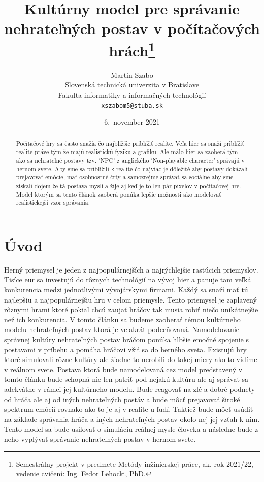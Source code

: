 \documentclass[10pt,oneside,slovak,a4paper]{article}
\title{Kultúrny model pre správanie nehrateľných postav v počítačových hrách\thanks{Semestrálny projekt v predmete Metódy inžinierskej práce, ak\@. rok 2021/22, vedenie cvičení: Ing. Fedor Lehocki, PhD.}}
\author{Martin Szabo\\[2pt]
	{\small Slovenská technická univerzita v Bratislave}\\
	{\small Fakulta informatiky a informačných technológií}\\
	{\small \texttt{xszabom5@stuba.sk}}
	}
\date{\small 6.\ november 2021}
\begin{document}
\maketitle
\begin{abstract}

Počítačové hry sa často snažia čo najbližšie priblížiť realite. Veľa hier sa snaží priblížiť realite práve tým že 
majú realistickú fyziku a grafiku. Ale málo hier sa zaoberá tým ako sa nehrateľné postavy tzv. `NPC' z anglického
`Non-playable character' správajú v hernom svete. Aby sme sa priblížili k realite čo najviac je dôležité aby postavy
dokázali prejavovať emócie, mať osobnostné črty a samozrejme správať sa sociálne aby sme získali dojem že tá postava
myslí a žije aj keď je to len pár pixelov v počítačovej hre. Model ktorým sa tento článok zaoberá ponúka lepšie
možnosti ako modelovať realistickejší vzor správania.

\end{abstract}


\section{Úvod}

Herný priemysel je jeden z najpopulárnejších a najrýchlejšie rastúcich priemyslov.
Tisíce eur sa investujú do rôznych technológií na vývoj hier a panuje tam veľká konkurencia
medzi jednotlivými vývojárskymi firmami. Každý sa snaží mať tú najlepšiu a najpopulárnejšiu
hru v celom priemysle. Tento priemysel je zaplavený rôznymi hrami ktoré pokiaľ chcú zaujať hráčov
tak musia robiť niečo unikátnejšie než ich konkurencia. V tomto článku sa budeme zaoberať témou
kultúrneho modelu nehrateľných postav ktorá je veľakrát podceňovaná. Namodelovanie správnej kultúry
nehrateľných postav hráčom ponúka hlbšie emočné spojenie s postavami v príbehu a pomáha hráčovi
vžiť sa do herného sveta. Existujú hry ktoré simulovali rôzne kultúry ale žiadne to nerobili do takej 
miery ako to vidíme v reálnom svete. Postava ktorá bude namodelovaná cez model predstavený v 
tomto článku bude schopná nie len patriť pod nejakú kultúru ale aj správať sa adekvátne v rámci
jej kultúrneho modelu. Bude reagovať na zlé a dobré podnety od hráča ale aj od iných nehrateľných 
postáv a bude môcť prejavovať široké spektrum emócií rovnako ako to je aj v realite u ľudí. Taktiež bude 
môcť usúdiť na základe správania hráča a iných nehrateľných postav okolo nej jej vzťah k nim. Tento model
sa bude usilovať o simuláciu reálnej mysle človeka a následne bude z neho vyplývať správanie nehrateľných
postav v hernom svete.
\end{document}

